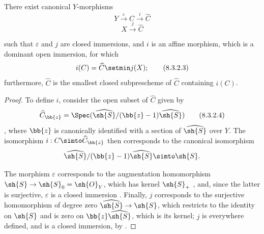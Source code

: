\begin{proposition}[8.3.2]
\label{II.8.3.2}
There exist canonical $Y$-morphisms
\[
\label{II.8.3.2.1}
  Y \xrightarrow{\varepsilon} C \xrightarrow{i} \widehat{C}
\tag{8.3.2.1}
\]
\[
\label{II.8.3.2.2}
  X \xrightarrow{j} \widehat{C}
\tag{8.3.2.2}
\]

such that $\varepsilon$ and $j$ are closed immersions, and $i$ is an affine morphism, which is a dominant open immersion, for which
\[
\label{II.8.3.2.3}
  i(C) = \widehat{C}\setmin j(X);
\tag{8.3.2.3}
\]
furthermore, $\widehat{C}$ is the smallest closed subprescheme of $\widehat{C}$ containing $i(C)$.
\end{proposition}

\begin{proof}
To define $i$, consider the open subset of $\widehat{C}$ given by
\[
\label{II.8.3.2.4}
  \widehat{C}_{\bb{z}} = \Spec(\widehat{\sh{S}}/(\bb{z}-1)\widehat{\sh{S}})
\tag{8.3.2.4}
\]
, where $\bb{z}$ is canonically identified with a section of $\widehat{\sh{S}}$ over $Y$.
The isomorphism $i: C\simto\widehat{C}_{\bb{z}}$ then corresponds to the canonical isomorphism 
\[
  \widehat{\sh{S}}/(\bb{z}-1)\widehat{\sh{S}} \simto \sh{S}.
\]

The morphism $\varepsilon$ corresponds to the augmentation homomorphism $\sh{S}\to\sh{S}_0=\sh{O}_Y$, which has kernel $\sh{S}_+$ , and, since the latter is surjective, $\varepsilon$ is a closed immersion .
Finally, $j$ corresponds  to the surjective homomorphism of degree zero $\widehat{\sh{S}}\to\sh{S}$, which restricts to the identity on $\sh{S}$ and is zero on $\bb{z}\widehat{\sh{S}}$, which is its kernel;
$j$ is everywhere defined, and is a closed immersion, by .


\end{proof}
